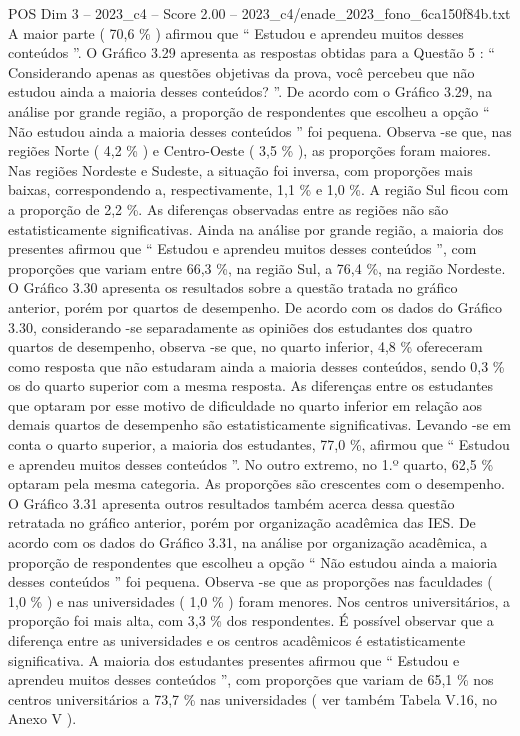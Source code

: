 \begin{textsample}{POS Dim 3 – 2023\_c4 – Score 2.00 – 2023\_c4/enade\_2023\_fono\_6ca150f84b.txt}
A maior parte ( 70,6 \% ) afirmou que “ Estudou e aprendeu muitos desses conteúdos ”.
O Gráfico 3.29 apresenta as respostas obtidas para a Questão 5 : “ Considerando apenas as questões objetivas da prova, você percebeu que não estudou ainda a maioria desses conteúdos? ”.
De acordo com o Gráfico 3.29, na análise por grande região, a proporção de respondentes que escolheu a opção “ Não estudou ainda a maioria desses conteúdos ” foi pequena.
Observa -se que, nas regiões Norte ( 4,2 \% ) e Centro-Oeste ( 3,5 \% ), as proporções foram maiores.
Nas regiões Nordeste e Sudeste, a situação foi inversa, com proporções mais baixas, correspondendo a, respectivamente, 1,1 \% e 1,0 \%.
A região Sul ficou com a proporção de 2,2 \%.
As diferenças observadas entre as regiões não são estatisticamente significativas.
Ainda na análise por grande região, a maioria dos presentes afirmou que “ Estudou e aprendeu muitos desses conteúdos ”, com proporções que variam entre 66,3 \%, na região Sul, a 76,4 \%, na região Nordeste.
O Gráfico 3.30 apresenta os resultados sobre a questão tratada no gráfico anterior, porém por quartos de desempenho.
De acordo com os dados do Gráfico 3.30, considerando -se separadamente as opiniões dos estudantes dos quatro quartos de desempenho, observa -se que, no quarto inferior, 4,8 \% ofereceram como resposta que não estudaram ainda a maioria desses conteúdos, sendo 0,3 \% os do quarto superior com a mesma resposta.
As diferenças entre os estudantes que optaram por esse motivo de dificuldade no quarto inferior em relação aos demais quartos de desempenho são estatisticamente significativas.
Levando -se em conta o quarto superior, a maioria dos estudantes, 77,0 \%, afirmou que “ Estudou e aprendeu muitos desses conteúdos ”.
No outro extremo, no 1.º quarto, 62,5 \% optaram pela mesma categoria.
As proporções são crescentes com o desempenho.
O Gráfico 3.31 apresenta outros resultados também acerca dessa questão retratada no gráfico anterior, porém por organização acadêmica das IES.
De acordo com os dados do Gráfico 3.31, na análise por organização acadêmica, a proporção de respondentes que escolheu a opção “ Não estudou ainda a maioria desses conteúdos ” foi pequena.
Observa -se que as proporções nas faculdades ( 1,0 \% ) e nas universidades ( 1,0 \% ) foram menores.
Nos centros universitários, a proporção foi mais alta, com 3,3 \% dos respondentes.
É possível observar que a diferença entre as universidades e os centros acadêmicos é estatisticamente significativa.
A maioria dos estudantes presentes afirmou que “ Estudou e aprendeu muitos desses conteúdos ”, com proporções que variam de 65,1 \% nos centros universitários a 73,7 \% nas universidades ( ver também Tabela V.16, no Anexo V ).

\end{textsample}
